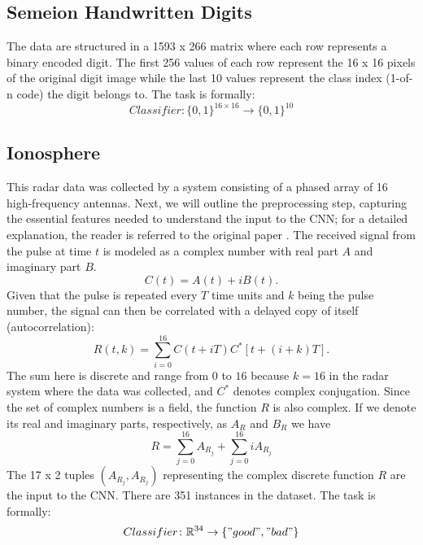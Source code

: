 \documentclass[a4paper, 11pt, twoside, openright]{article}
\begin{document}
\subsection{Semeion Handwritten Digits} \label{sub:semeion}
The data are structured in a 1593 x 266 matrix where each row represents a binary encoded digit. The first 256 values of each row represent the 16 x 16 pixels of the original digit image while the last 10 values represent the class index (1-of-n code) the digit belongs to. The task is formally:
\begin{equation}
Classifier \colon \{0, 1\}^{16 \times 16} \to \{0, 1\}^{10}
\end{equation}

\subsection{Ionosphere} \label{sub:ion}

This radar data was collected by a system consisting of a phased array of 16 high-frequency antennas.  Next, we will outline the preprocessing step, capturing the essential features needed to understand the input to the CNN; for a detailed explanation, the reader is referred to the original paper \cite{sigillito1989classification}. The received signal from the pulse at time $t$ is modeled as a complex number with real part $A$ and imaginary part $B$.
\begin{equation}
	C(t) = A(t) + iB(t).
\end{equation}
Given that the pulse is repeated every $T$ time units and $k$ being the pulse number, the signal can then be correlated with a delayed copy of itself (autocorrelation):
\begin{equation}\label{eq:acf:r}
	R(t, k) = \sum_{i=0}^{16} C(t + iT)C^*[t + (i + k)T].
\end{equation}
The sum here is discrete and range from $0$ to $16$ because $k = 16$ in the radar system where the data was collected, and $C^*$ denotes complex conjugation. Since the set of complex numbers is a field, the function $R$ is also complex. If we denote its real and imaginary parts, respectively, as $A_R$ and $B_R$ we have
\begin{equation}\label{eq:acf:c}
R = \sum_{j=0}^{16} A_{R_j} + \sum_{j=0}^{16} iA_{R_j}
\end{equation}
The 17 x 2 tuples $(A_{R_j}, A_{R_j})$ representing the complex discrete function $R$ are the input to the CNN. There are 351 instances in the dataset. The task is formally:
\begin{equation}
Classifier \colon \mathbb{R}^{34} \to \{"good", "bad"\}
\end{equation}
\end{document}
